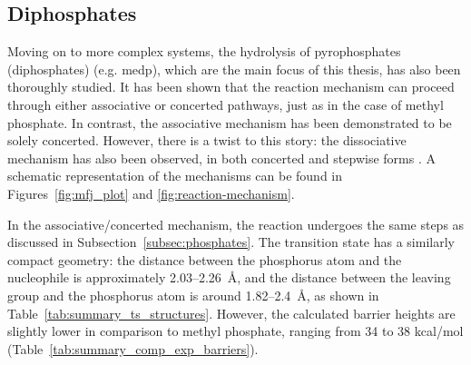 \subsection{Diphosphates}
Moving on to more complex systems, the hydrolysis of pyrophosphates (diphosphates) (e.g. \ac{medp}), which are the main focus of this thesis, has also been thoroughly studied. It has been shown that the reaction mechanism can proceed through either associative or concerted pathways, just as in the case of methyl phosphate. In contrast, the associative mechanism has been demonstrated to be solely concerted. However, there is a twist to this story: the dissociative mechanism has also been observed, in both concerted and stepwise forms \citep{klahnMechanismHydrolysisPhosphate2006, kamerlinAssociativeDissociativeMechanisms2008, prasadAddressingOpenQuestions2013}. A schematic representation of the mechanisms can be found in Figures~\ref{fig:mfj_plot} and \ref{fig:reaction-mechanism}.

In the associative/concerted mechanism, the reaction undergoes the same steps as discussed in Subsection~\ref{subsec:phosphates}. The transition state has a similarly compact geometry: the distance between the phosphorus atom and the nucleophile is approximately 2.03--2.26~\AA, and the distance between the leaving group and the phosphorus atom is around 1.82--2.4~\AA, as shown in Table~\ref{tab:summary_ts_structures}. However, the calculated barrier heights are slightly lower in comparison to methyl phosphate, ranging from 34 to 38 kcal/mol (Table~\ref{tab:summary_comp_exp_barriers}).

